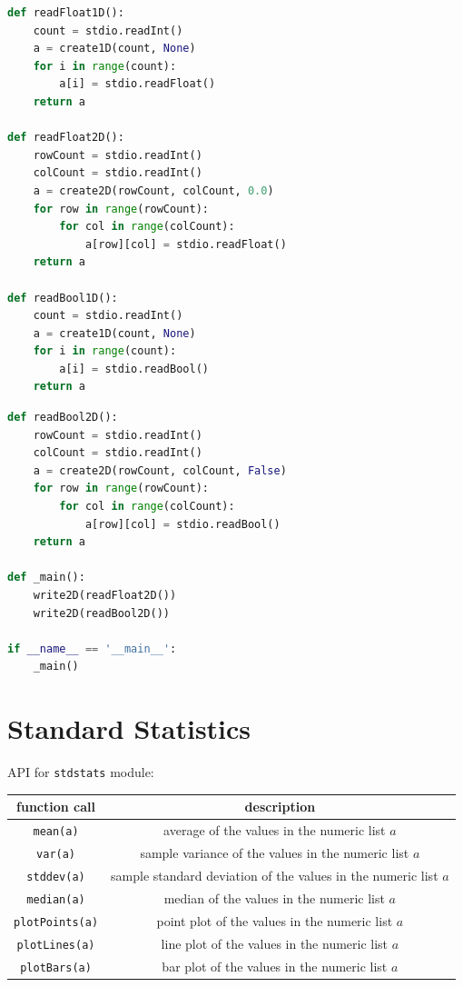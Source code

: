 \documentclass[8pt,a4paper,compress,handout]{beamer}
\begin{document}
\begin{frame}[fragile]
\begin{lstlisting}[language=Python]
def readFloat1D():
    count = stdio.readInt()
    a = create1D(count, None)
    for i in range(count):
        a[i] = stdio.readFloat()
    return a

def readFloat2D():
    rowCount = stdio.readInt()
    colCount = stdio.readInt()
    a = create2D(rowCount, colCount, 0.0)
    for row in range(rowCount):
        for col in range(colCount):
            a[row][col] = stdio.readFloat()
    return a

def readBool1D():
    count = stdio.readInt()
    a = create1D(count, None)
    for i in range(count):
        a[i] = stdio.readBool()
    return a
\end{lstlisting}
\end{frame}


\begin{frame}[fragile]
\begin{lstlisting}[language=Python]
def readBool2D():
    rowCount = stdio.readInt()
    colCount = stdio.readInt()
    a = create2D(rowCount, colCount, False)
    for row in range(rowCount):
        for col in range(colCount):
            a[row][col] = stdio.readBool()
    return a

def _main():
    write2D(readFloat2D())
    write2D(readBool2D())

if __name__ == '__main__':
    _main()
\end{lstlisting}
\end{frame}

\section{Standard Statistics}
\begin{frame}[fragile]
API for \lstinline{stdstats} module:
\begin{center}
\begin{tabular}{cc}
function call & description \\ \hline
\lstinline$mean(a)$ & average of the values in the numeric list $a$ \\
\lstinline$var(a)$ & sample variance of the values in the numeric list $a$ \\
\lstinline$stddev(a)$ & sample standard deviation of the values in the numeric list $a$ \\
\lstinline$median(a)$ & median of the values in the numeric list $a$ \\
\lstinline$plotPoints(a)$ & point plot of the values in the numeric list $a$ \\
\lstinline$plotLines(a)$ & line plot of the values in the numeric list $a$ \\
\lstinline$plotBars(a)$ & bar plot of the values in the numeric list $a$
\end{tabular} 
\end{center}
\end{frame}
\end{document}
